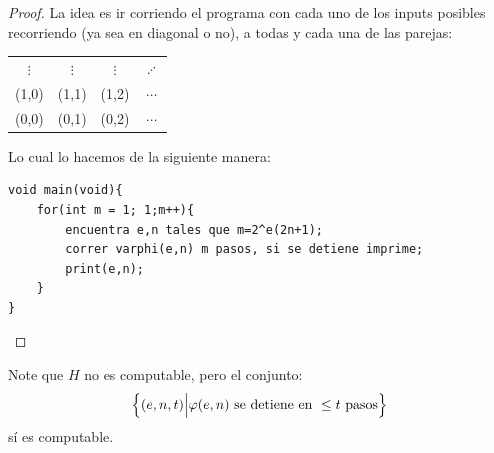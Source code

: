 \documentclass[12pt]{report}
\theoremstyle{largebreak}
\begin{document}
    \begin{proof}
        La idea es ir corriendo el programa con cada uno de los inputs posibles recorriendo (ya sea en diagonal o no), a todas y cada una de las parejas:
        
        \begin{center}
            \begin{tabular}{c c c c}
                $\vdots$ & $\vdots$ & $\vdots$ & $\iddots$ \\
                (1,0) & (1,1) & (1,2) & $\cdots$ \\
                (0,0) & (0,1) & (0,2) & $\cdots$ \\
            \end{tabular}
        \end{center}

        Lo cual lo hacemos de la siguiente manera:

        \begin{lstlisting}
void main(void){
    for(int m = 1; 1;m++){
        encuentra e,n tales que m=2^e(2n+1);
        correr varphi(e,n) m pasos, si se detiene imprime;
        print(e,n);
    }
}
        \end{lstlisting}

    \end{proof}

    \begin{obs}
        Note que $H$ no es computable, pero el conjunto:
        \begin{equation*}
            \left\{(e,n,t)\Big|\varphi(e,n)\textup{ se detiene en }\leq t\textup{ pasos} \right\}
        \end{equation*}
        sí es computable.
    \end{obs}
\end{document}
